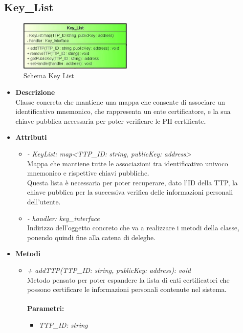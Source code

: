 \subsection{Key\_List}
\begin{figure}[!h]
	\centering
	\includegraphics[width=0.5\textwidth]{immagini/keylistData}
	\caption{Schema Key List}
\end{figure}
\begin{itemize}
	\item \textbf{Descrizione}\\
	Classe concreta che mantiene una mappa che consente di associare un identificativo mnemonico, che rappresenta un ente certificatore, e la sua chiave pubblica necessaria per poter verificare le \gls{PII} certificate.
	\item \textbf{Attributi}
	\begin{itemize}
		\item \textit{- KeyList: map<TTP\_ID: string, publicKey: address>}\\
		Mappa che mantiene tutte le associazioni tra identificativo univoco mnemonico e rispettive chiavi pubbliche.\\
		Questa lista è necessaria per poter recuperare, dato l'ID della \gls{TTP}, la chiave pubblica per la successiva verifica delle informazioni personali dell'utente.
		\item \textit{- handler: key\_interface}\\
		Indirizzo dell'oggetto concreto che va a realizzare i metodi della classe, ponendo quindi fine alla catena di deleghe.		
	\end{itemize}
	\item \textbf{Metodi}
	\begin{itemize}
		\item \textit{+ addTTP(TTP\_ID: string, publicKey: address): void}\\
		Metodo pensato per poter espandere la lista di enti certificatori che possono certificare le informazioni personali contenute nel sistema.\\\\
		\textbf{Parametri:}
		\begin{itemize}
			\item \textit{TTP\_ID: string}\\

\end{itemize}
\end{itemize}
\end{itemize}

